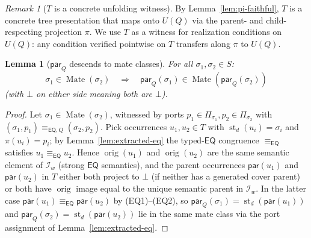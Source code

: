 \documentclass[11pt]{article}
\newtheorem{lemma}[theorem]{Lemma}
\theoremstyle{definition}
\theoremstyle{remark}
\newtheorem{remark}[theorem]{Remark}
\newcommand{\EQ}{\mathsf{EQ}}
\newcommand{\st}{\operatorname{st}}
\newcommand{\orig}{\operatorname{orig}}
\newcommand{\eqcong}{\equiv_{\EQ}}
\newcommand{\eqQ}{\equiv_{\EQ,Q}}
\newcommand{\Mate}{\operatorname{Mate}}
\begin{document}
\begin{remark}[$T$ is a concrete unfolding witness]
\label{rem:T-is-unfolding}
By Lemma~\ref{lem:pi-faithful}, $T$ is a concrete tree presentation
that maps onto $U(Q)$ via the parent- and child-respecting
projection $\pi$.  We use $T$ as a witness for realization
conditions on $U(Q)$: any condition verified pointwise on $T$
transfers along $\pi$ to $U(Q)$.
\end{remark}

\begin{lemma}[$\mathsf{par}_Q$ descends to mate
classes]\label{lem:par-mate}
For all $\sigma_1,\sigma_2 \in S$:
\[
\sigma_1 \in \Mate(\sigma_2)
\quad\Longrightarrow\quad
\mathsf{par}_Q(\sigma_1) \in \Mate(\mathsf{par}_Q(\sigma_2))
\]
(with $\bot$ on either side meaning both are $\bot$).
\end{lemma}

\begin{proof}
Let $\sigma_1\in\Mate(\sigma_2)$, witnessed by ports $p_1\in\Pi_{\sigma_1},
p_2\in\Pi_{\sigma_2}$ with $(\sigma_1,p_1)\eqQ(\sigma_2,p_2)$.  Pick
occurrences $u_1,u_2\in T$ with $\st_d(u_i)=\sigma_i$ and $\pi(u_i)=p_i$;
by Lemma~\ref{lem:extracted-eq} the typed-$\EQ$ congruence $\eqcong$
satisfies $u_1\eqcong u_2$.  Hence $\orig(u_1)$ and $\orig(u_2)$ are
the same semantic element of $\mathcal{I}_w$ (strong $\EQ$ semantics),
and the parent occurrences $\mathsf{par}(u_1)$ and $\mathsf{par}(u_2)$
in $T$ either both project to $\bot$ (if neither has a generated cover
parent) or both have $\orig$ image equal to the unique semantic parent
in $\mathcal{I}_w$.  In the latter case
$\mathsf{par}(u_1)\eqcong\mathsf{par}(u_2)$ by (EQ1)--(EQ2), so
$\mathsf{par}_Q(\sigma_1)=\st_d(\mathsf{par}(u_1))$ and
$\mathsf{par}_Q(\sigma_2)=\st_d(\mathsf{par}(u_2))$ lie in the same
mate class via the port assignment of
Lemma~\ref{lem:extracted-eq}.\end{proof}
\end{document}
